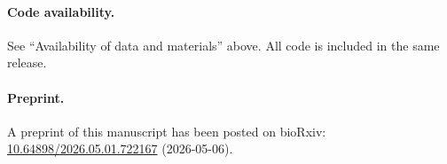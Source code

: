 \documentclass[sn-basic]{sn-jnl}
\begin{document}
\paragraph{Code availability.} See ``Availability of data and materials'' above. All code is included in the same release.

\paragraph{Preprint.} A preprint of this manuscript has been posted on bioRxiv: \href{https://doi.org/10.64898/2026.05.01.722167}{10.64898/2026.05.01.722167} (2026-05-06).



\end{document}
